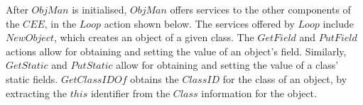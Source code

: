 
After $ObjMan$ is initialised, $ObjMan$ offers services to the other
components of the $CEE$, in the $Loop$ action shown below.
The services offered by $Loop$ include $NewObject$, which creates an
object of a given class.
The $GetField$ and $PutField$ actions allow for obtaining and setting
the value of an object's field.
Similarly, $GetStatic$ and $PutStatic$ allow for obtaining and setting
the value of a class' static fields.
$GetClassIDOf$ obtains the $ClassID$ for the class of an object, by
extracting the $this$ identifier from the $Class$ information for the
object.

